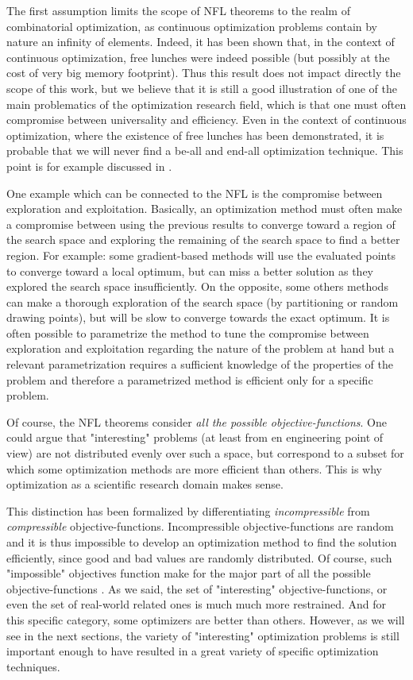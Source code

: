 The first assumption limits the scope of NFL theorems to the realm of combinatorial optimization, as continuous optimization problems contain by nature an infinity of elements. Indeed, it has been shown that, in the context of continuous optimization, free lunches were indeed possible \cite{Auger-s00453-008-9244-5} (but possibly at the cost of very big memory footprint). Thus this result does not impact directly the scope of this work, but we believe that it is still a good illustration of one of the main problematics of the optimization research field, which is that one must often compromise between universality and efficiency. Even in the context of continuous optimization, where the existence of free lunches has been demonstrated, it is probable that we will never find a be-all and end-all optimization technique. This point is for example discussed in \cite{Doe05}.

One example which can be connected to the NFL is the compromise between exploration and exploitation. Basically, an optimization method must often make a compromise between using the previous results to converge toward a region of the search space and exploring the remaining of the search space to find a better region.
For example: some gradient-based methods will use the evaluated points to converge toward a local optimum, but can miss a better solution as they explored the search space insufficiently. On the opposite, some others methods can make a thorough exploration of the search space (by partitioning or random drawing points), but will be slow to converge towards the exact optimum.
It is often possible to parametrize the method to tune the compromise between exploration and exploitation regarding the nature of the problem at hand but a relevant parametrization requires a sufficient knowledge of the properties of the problem and therefore a parametrized method is efficient only for a specific problem.

Of course, the NFL theorems consider \emph{all the possible objective-functions}. One could argue that "interesting" problems (at least from en engineering point of view) are not distributed evenly over such a space, but correspond to a subset for which some optimization methods are more efficient than others. This is why optimization as a scientific research domain makes sense. 

This distinction has been formalized by differentiating \emph{incompressible} from \emph{compressible} objective-functions. Incompressible objective-functions are random and it is thus impossible to develop an optimization method to find the solution efficiently, since good and bad values are randomly distributed. Of course, such "impossible" objectives function make for the major part of all the possible objective-functions \cite{English:3-540-45356-3_7}.
As we said, the set of "interesting" objective-functions, or even the set of real-world related ones is much much more restrained. And for this specific category, some optimizers are better than others. 
However, as we will see in the next sections, the variety of "interesting" optimization problems is still important enough to have resulted in a great variety of specific optimization techniques.


